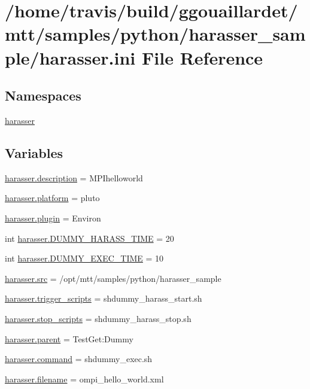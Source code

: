\hypertarget{harasser_8ini}{\section{/home/travis/build/ggouaillardet/mtt/samples/python/harasser\-\_\-sample/harasser.ini File Reference}
\label{harasser_8ini}
}
\subsection*{Namespaces}
\begin{DoxyCompactItemize}
\item 
\hyperlink{namespaceharasser}{harasser}
\end{DoxyCompactItemize}
\subsection*{Variables}
\begin{DoxyCompactItemize}
\item 
\hyperlink{namespaceharasser_ae9df0d8dd5280b3f68c1594d929d77e9}{harasser.\-description} = M\-P\-Ihelloworld
\item 
\hyperlink{namespaceharasser_aa827937946f071c462edd50adeffbf99}{harasser.\-platform} = pluto
\item 
\hyperlink{namespaceharasser_af41bea3324a7007e30dccbc1526e63b2}{harasser.\-plugin} = Environ
\item 
int \hyperlink{namespaceharasser_a5335f316caefd7dcb9a59e1541f56a10}{harasser.\-D\-U\-M\-M\-Y\-\_\-\-H\-A\-R\-A\-S\-S\-\_\-\-T\-I\-M\-E} = 20
\item 
int \hyperlink{namespaceharasser_a3663429ea3884044eef5813de2c88893}{harasser.\-D\-U\-M\-M\-Y\-\_\-\-E\-X\-E\-C\-\_\-\-T\-I\-M\-E} = 10
\item 
\hyperlink{namespaceharasser_a5cb1fdd5bdc77091984dbf7901fd7e00}{harasser.\-src} = /opt/mtt/samples/python/harasser\-\_\-sample
\item 
\hyperlink{namespaceharasser_aaf0bf1c41f9f803a38db036d20b51461}{harasser.\-trigger\-\_\-scripts} = shdummy\-\_\-harass\-\_\-start.\-sh
\item 
\hyperlink{namespaceharasser_acf2bbc7d9fff08e2232c16a79b0e72f4}{harasser.\-stop\-\_\-scripts} = shdummy\-\_\-harass\-\_\-stop.\-sh
\item 
\hyperlink{namespaceharasser_af9d9d7cb6a6d68880aeec6ccfa16ca23}{harasser.\-parent} = Test\-Get\-:\-Dummy
\item 
\hyperlink{namespaceharasser_a688e3d531b66f0b8013fd72625d9a0b5}{harasser.\-command} = shdummy\-\_\-exec.\-sh
\item 
\hyperlink{namespaceharasser_a8ee1446e84f466e788ff1e2b61666751}{harasser.\-filename} = ompi\-\_\-hello\-\_\-world.\-xml
\end{DoxyCompactItemize}
